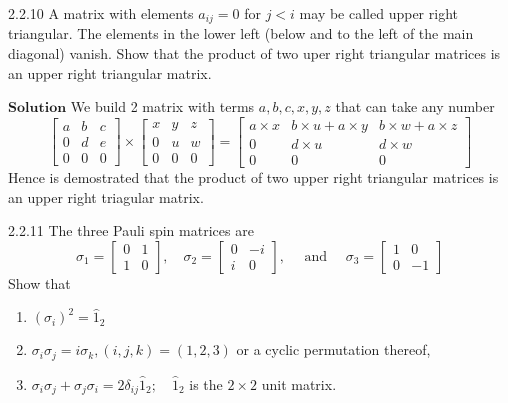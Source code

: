 \documentclass{styles/kaobook}
\begin{document}
\newpage


\begin{greenbox}{2.2.10}
A matrix with elements $a_{i j}=0$ for $j<i$ may be called upper right triangular. The
elements in the lower left (below and to the left of the main diagonal) vanish. Show that
the product of two uper right triangular matrices is an upper right triangular matrix. 
\end{greenbox}



$\boxed{\textbf{Solution}}$ We build 2 matrix with terms $a,b,c,x,y,z$ that can take any number
$$\begin{bmatrix}{a} & {b} & {c} \\ {0} & {d} & {e} \\ {0} & {0} & {0}\end{bmatrix} \times\begin{bmatrix}{x} & {y} & {z} \\ {0} & {u} & {w} \\ {0} & {0} & {0}\end{bmatrix}=\begin{bmatrix}{a\times x} & {b \times u+a\times y} & {b \times w+a\times z} \\ {0} & {d \times u} & {d \times w} \\ {0} & {0} & {0}\end{bmatrix}$$
Hence is demostrated that the product of two upper right triangular matrices is an upper right triagular matrix.


\begin{greenbox}{2.2.11}
The three Pauli spin matrices are
$$
\sigma_{1}=\begin{bmatrix}{0} & {1} \\ {1} & {0}\end{bmatrix}, \quad \sigma_{2}=\begin{bmatrix}{0} & {-i} \\ {i} & {0}\end{bmatrix}, \quad \text { and } \quad \sigma_{3}=\begin{bmatrix}{1} & {0} \\ {0} & {-1}\end{bmatrix}
$$
Show that

\begin{enumerate}[$(a)$]
\item $\left(\sigma_{i}\right)^{2}=\hat{1}_{2}$
\item $\sigma_{i} \sigma_{j}=i \sigma_{k},(i, j, k)=(1,2,3)$ or a cyclic permutation thereof,
\item $\sigma_{i} \sigma_{j}+\sigma_{j} \sigma_{i}=2 \delta_{i j} \hat{1}_{2} ; \quad \hat{1}_{2}$ is the $2 \times 2$ unit matrix.
\end{enumerate}
\end{greenbox}
\end{document}
